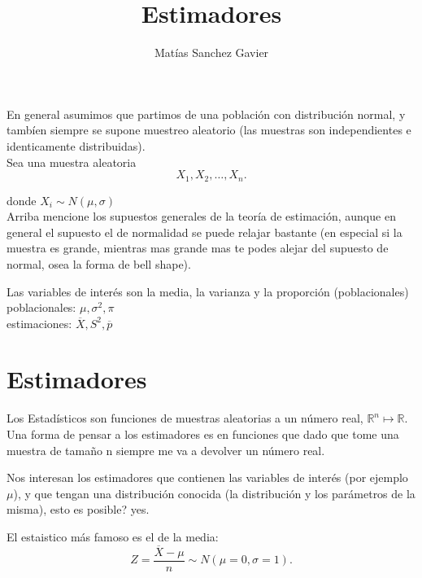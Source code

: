 \documentclass[a4paper]{article}
\title{Estimadores}
\author{Matías Sanchez Gavier }
\begin{document}
\maketitle


En general asumimos que partimos de una población con distribución normal, y tambíen siempre se supone muestreo aleatorio (las muestras son independientes e identicamente distribuidas). \\
Sea una muestra aleatoria
\[
	X_1, X_2, \ldots, X_n
.\] 

donde  $ X_i \sim N(\mu, \sigma)$ \\

Arriba mencione los supuestos generales de la teoría de estimación, aunque en general el supuesto el de normalidad se puede relajar bastante (en especial si la muestra es grande, mientras mas grande mas te podes alejar del supuesto de normal, osea la forma de bell shape). 

Las variables de interés son la media, la varianza y la proporción (poblacionales)\\[1cm]
poblacionales: $ \mu, \sigma^2,  \pi$\\
estimaciones: $\overline{X}, S^{2}, \overline{p} $

\section{Estimadores}
Los Estadísticos son funciones de muestras aleatorias a un número real, $\mathbb{R}^{n} \mapsto  \mathbb{R}$.  Una forma de pensar a los estimadores es en funciones que dado que tome una muestra de tamaño n siempre me va a devolver un número real.

Nos interesan los estimadores que contienen las variables de interés (por ejemplo $\mu$), y que tengan una distribución conocida (la distribución y los parámetros de la misma), esto es posible? yes.

El estaistico más famoso es el de la media:
\[
    Z = \frac{\overline{X}-\mu}{n} \sim N(\mu=0, \sigma=1)
.\] 
\end{document}
